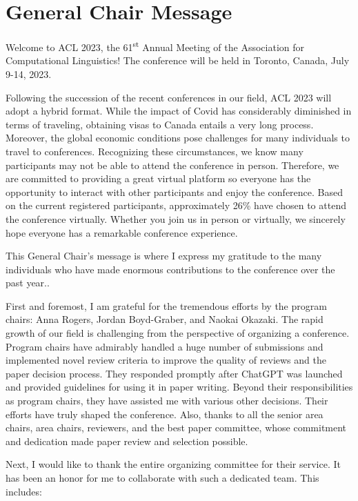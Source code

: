 \section{General Chair Message}

Welcome to ACL 2023, the 61\textsuperscript{st} Annual Meeting of the Association for Computational Linguistics! The conference will be held in Toronto, Canada, July 9-14, 2023.

Following the succession of the recent conferences in our field, ACL 2023 will adopt a hybrid format. While the impact of Covid has considerably diminished in terms of traveling, obtaining visas to Canada entails a very long process. Moreover, the global economic conditions pose challenges for many individuals to travel to conferences. Recognizing these circumstances, we know many participants may not be able to attend the conference in person. Therefore, we are committed to providing a great virtual platform so everyone has the opportunity to interact with other participants and enjoy the conference. Based on the current registered participants, approximately 26\% have chosen to attend the conference virtually. Whether you join us in person or virtually, we sincerely hope everyone has a remarkable conference experience.


This General Chair’s message is where I express my gratitude to the many individuals who have made enormous contributions to the conference over the past year..

First and foremost, I am grateful for the tremendous efforts by the program chairs: Anna Rogers, Jordan Boyd-Graber, and Naokai Okazaki. The rapid growth of our field is challenging from the perspective of organizing a conference. Program chairs have admirably handled a huge number of submissions and implemented novel review criteria to improve the quality of reviews and the paper decision process. They responded promptly after ChatGPT was launched and provided guidelines for using it in paper writing. Beyond their responsibilities as program chairs, they have assisted me with various other decisions. Their efforts have truly shaped the conference. Also, thanks to all the senior area chairs, area chairs, reviewers, and the best paper committee, whose commitment and dedication made paper review and selection possible.

Next, I would like to thank the entire organizing committee for their service. It has been an honor for me to collaborate with such a dedicated team. This includes:

